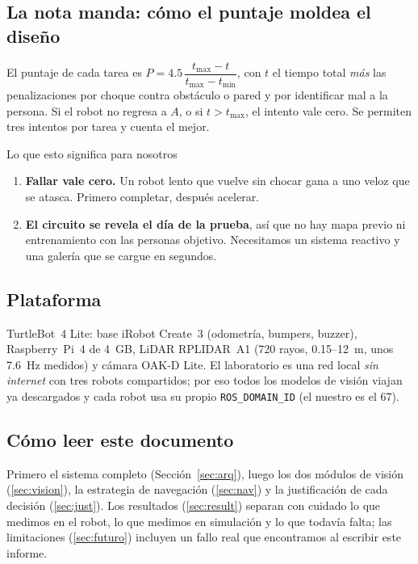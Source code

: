 \documentclass[11pt,a4paper]{article}
\begin{document}
\subsection{La nota manda: c\'omo el puntaje moldea el dise\~no}
El puntaje de cada tarea es $P = 4.5\,\dfrac{t_{\max}-t}{t_{\max}-t_{\min}}$, con $t$ el tiempo total \emph{m\'as} las penalizaciones por choque
contra obst\'aculo o pared y por identificar mal a la persona. Si el robot no regresa a $A$, o si $t>t_{\max}$, el intento vale cero. Se permiten tres
intentos por tarea y cuenta el mejor.

\begin{decision}{Lo que esto significa para nosotros}
\begin{enumerate}[nosep]
\item \textbf{Fallar vale cero.} Un robot lento que vuelve sin chocar gana a uno veloz que se atasca. Primero completar, despu\'es acelerar.
\item \textbf{El circuito se revela el d\'ia de la prueba}, as\'i que no hay mapa previo ni entrenamiento con las personas objetivo. Necesitamos un
sistema reactivo y una galer\'ia que se cargue en segundos.
\end{enumerate}
\end{decision}

\subsection{Plataforma}
TurtleBot~4 Lite: base iRobot Create~3 (odometr\'ia, bumpers, buzzer), Raspberry~Pi~4 de 4~GB, LiDAR RPLIDAR~A1 (720 rayos, 0.15--12~m, unos 7.6~Hz
medidos) y c\'amara OAK-D Lite. El laboratorio es una red local \emph{sin internet} con tres robots compartidos; por eso todos los modelos de visi\'on
viajan ya descargados y cada robot usa su propio \texttt{ROS\_DOMAIN\_ID} (el nuestro es el 67).

\subsection{C\'omo leer este documento}
Primero el sistema completo (Secci\'on~\ref{sec:arq}), luego los dos m\'odulos de visi\'on (\ref{sec:vision}), la estrategia de navegaci\'on
(\ref{sec:nav}) y la justificaci\'on de cada decisi\'on (\ref{sec:just}). Los resultados (\ref{sec:result}) separan con cuidado lo que medimos en el robot,
lo que medimos en simulaci\'on y lo que todav\'ia falta; las limitaciones (\ref{sec:futuro}) incluyen un fallo real que encontramos al escribir este informe.
\end{document}
